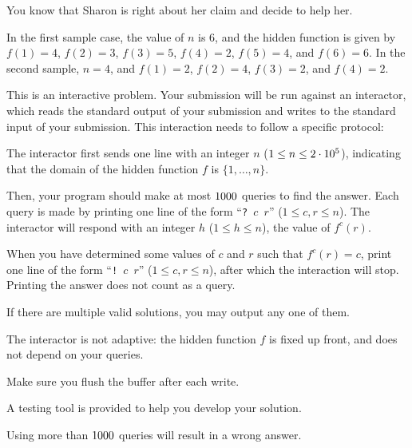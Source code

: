 You know that Sharon is right about her claim and decide to help her.

In the first sample case, the value of $n$ is 6, and the hidden function is
given by $f(1) = 4$, $f(2) = 3$, $f(3) = 5$, $f(4) = 2$, $f(5) = 4$, and $f(6) =
6$. In the second sample, $n = 4$, and $f(1) = 2$, $f(2) = 4$, $f(3) = 2$, and $f(4) = 2$.

\vspace{-0.5em}
\begin{Interaction}
This is an interactive problem. Your submission will be run against an interactor, which reads
the standard output of your submission and writes to the standard input of your submission. This
interaction needs to follow a specific protocol:

The interactor first sends
one line with an integer $n$ ($1 \leq n \leq 2\cdot 10^5$),
indicating that the domain of the hidden function $f$ is $\{1,\dots,n\}$.

Then, your program should make at most $1000$ queries to find the answer.
Each query is made by printing one line of the form ``\texttt{?~$c$~$r$}'' ($1 \leq c, r \leq n$).
The interactor will respond with an integer $h$ ($1 \leq h \leq n$), the value of $f^c(r)$.

When you have determined some values of $c$ and $r$ such that $f^c(r) = c$,
print one line of the form ``\texttt{!~$c$~$r$}'' ($1 \leq c, r \leq n$),
after which the interaction will stop.
Printing the answer does not count as a query.

If there are multiple valid solutions, you may output any one of them.

The interactor is not adaptive: the hidden function $f$ is fixed up front, and does not depend on your queries.

Make sure you flush the buffer after each write.

A testing tool is provided to help you develop your solution.

Using more than $1000$ queries will result in a wrong answer.
\end{Interaction}
